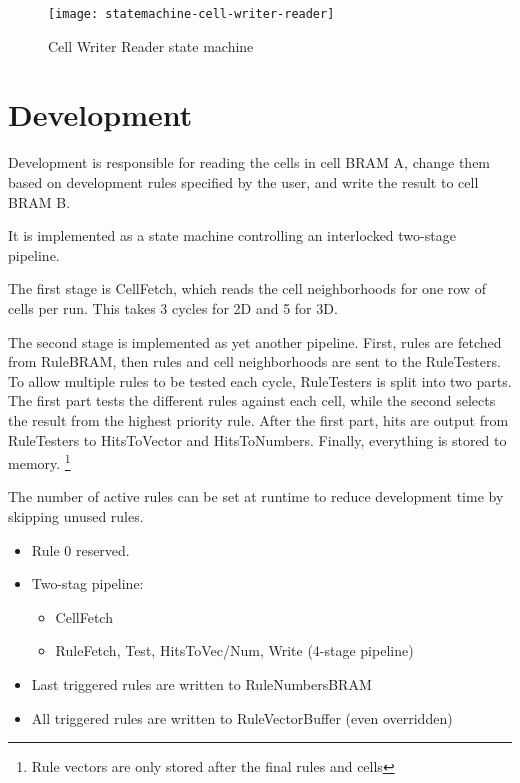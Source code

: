 \begin{figure}[!ht]
    \centering
    \texttt{[image: statemachine-cell-writer-reader]}
    \caption{Cell Writer Reader state machine}
    \label{fig:statemachine-cell-writer-reader}
\end{figure}

\section{Development}

Development is responsible for reading the cells in cell BRAM A, change them based on development rules specified by the user, and write the result to cell BRAM B.

It is implemented as a state machine controlling an interlocked two-stage pipeline.

The first stage is CellFetch, which reads the cell neighborhoods for one row of cells per run.
This takes 3 cycles for 2D and 5 for 3D.

The second stage is implemented as yet another pipeline.
First, rules are fetched from RuleBRAM, then rules and cell neighborhoods are sent to the RuleTesters.
To allow multiple rules to be tested each cycle, RuleTesters is split into two parts.
The first part tests the different rules against each cell, while the second selects the result from the highest priority rule.
After the first part, hits are output from RuleTesters to HitsToVector and HitsToNumbers.
Finally, everything is stored to memory.
\footnote{Rule vectors are only stored after the final rules and cells}

The number of active rules can be set at runtime to reduce development time by skipping unused rules.
\TODO
{}

\begin{itemize}
    \item Rule 0 reserved.
    \item Two-stag pipeline:
    \begin{itemize}
        \item CellFetch
        \item RuleFetch, Test, HitsToVec/Num, Write (4-stage pipeline)
    \end{itemize}
    \item Last triggered rules are written to RuleNumbersBRAM
    \item All triggered rules are written to RuleVectorBuffer (even overridden)
\end{itemize}

